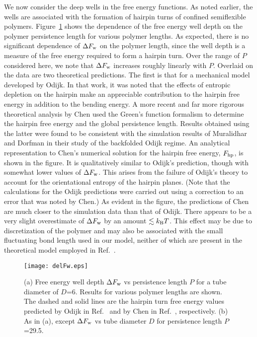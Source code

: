 \documentclass[journal=mamobx,manuscript=article,layout=twocolumn]{achemso}
\begin{document}
We now consider the deep wells in the free energy functions. As noted earlier, the wells 
are associated with the formation of hairpin turns of confined semiflexible polymers.
Figure~\ref{fig:delFw} shows the dependence of the free energy well depth on the
polymer persistence length for various polymer lengths. As expected, there is no
significant dependence of $\Delta F_{\rm w}$ on the polymer length, since the 
well depth is a measure of the free energy required to form a hairpin turn.
Over the range of $P$ considered here, we note that $\Delta F_{\rm w}$ increases 
roughly linearly with $P$.  Overlaid on the data are two theoretical predictions. 
The first is that for a mechanical model developed by Odijk.\cite{odijk2006dna,odijk2008scaling} 
In that work, it was noted that the effects of entropic depletion on the hairpin
make an appreciable contribution to the hairpin free energy in addition
to the bending energy. A more recent and far more rigorous theoretical analysis by 
Chen\cite{chen2017conformational} used the Green's function formalism to determine the 
hairpin free energy and the global persistence length. Results obtained using the latter 
were found to be consistent with the simulation results of Muralidhar and
Dorfman in their study of the backfolded Odijk regime.\cite{muralidhar2016backfolding} 
An analytical representation to Chen's
numerical solution for the hairpin free energy, $F_{\rm hp}$, is shown in the figure.
It is qualitatively similar to Odijk's prediction, though with somewhat lower values of 
$\Delta F_{\rm w}$. This arises from the failure of Odijk's theory to account for
the orientational entropy of the hairpin planes.\cite{chen2017conformational}
(Note that the calculations for the Odijk predictions were carried out using a
correction to an error that was noted by Chen.\cite{chen2017conformational})
As evident in the figure, the predictions of Chen are much closer to the simulation
data than that of Odijk. There appears to be a very slight overestimate of $\Delta F_{\rm w}$
by an amount $\lesssim k_{\rm B}T$. This effect may be due to discretization of the polymer
and may also be associated with the small fluctuating bond length used in our model, neither of
which are present in the theoretical model employed in Ref.~. 

\begin{figure}[!ht]
\begin{center}
\texttt{[image: delFw.eps]}
\end{center}
\caption{(a) Free energy well depth $\Delta F_{\rm w}$ vs persistence length $P$ for a tube 
diameter of $D$=6. Results for various polymer lengths are shown. 
The dashed and solid lines are the hairpin turn free energy values predicted by Odijk in 
Ref.~ and by Chen in Ref.~,
respectively. (b) As in (a), except $\Delta F_{\rm w}$ vs tube diameter $D$ for persistence 
length $P$=29.5.
}
\label{fig:delFw}
\end{figure}
\end{document}

